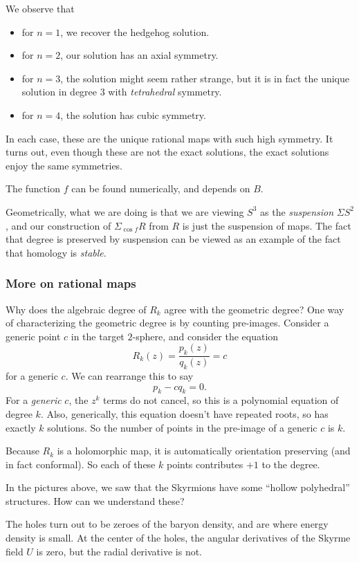 \documentclass[a4paper]{article}
\begin{document}
We observe that
\begin{itemize}
  \item for $n = 1$, we recover the hedgehog solution.
  \item for $n = 2$, our solution has an axial symmetry.
  \item for $n = 3$, the solution might seem rather strange, but it is in fact the unique solution in degree $3$ with \emph{tetrahedral} symmetry.
  \item for $n = 4$, the solution has cubic symmetry.
\end{itemize}
In each case, these are the unique rational maps with such high symmetry. It turns out, even though these are not the exact solutions, the exact solutions enjoy the same symmetries.

The function $f$ can be found numerically, and depends on $B$.

Geometrically, what we are doing is that we are viewing $S^3$ as the \emph{suspension} $\Sigma S^2$, and our construction of $\Sigma_{\cos f} R$ from $R$ is just the suspension of maps. The fact that degree is preserved by suspension can be viewed as an example of the fact that homology is \emph{stable}.

\subsubsection*{More on rational maps}
Why does the algebraic degree of $R_k$ agree with the geometric degree? One way of characterizing the geometric degree is by counting pre-images. Consider a generic point $c$ in the target $2$-sphere, and consider the equation
\[
  R_k(z) = \frac{p_k(z)}{q_k(z)} = c
\]
for a generic $c$. We can rearrange this to say
\[
  p_k - c q_k = 0.
\]
For a \emph{generic} $c$, the $z^k$ terms do not cancel, so this is a polynomial equation of degree $k$. Also, generically, this equation doesn't have repeated roots, so has exactly $k$ solutions. So the number of points in the pre-image of a generic $c$ is $k$.

Because $R_k$ is a holomorphic map, it is automatically orientation preserving (and in fact conformal). So each of these $k$ points contributes $+1$ to the degree.

In the pictures above, we saw that the Skyrmions have some ``hollow polyhedral'' structures. How can we understand these?

The holes turn out to be zeroes of the baryon density, and are where energy density is small. At the center of the holes, the angular derivatives of the Skyrme field $U$ is zero, but the radial derivative is not. %
\end{document}
